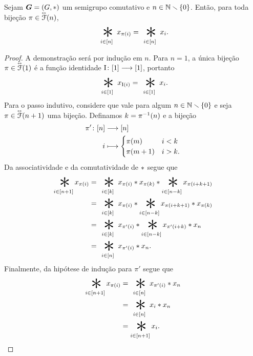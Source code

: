\begin{proposition}
\label{prop:comutatividade.generalizada}
Sejam $\bm G=(G,\ast)$ um semigrupo comutativo e $n \in \mathbb{N} \smallsetminus \{0\}$. Então, para toda bijeção $\pi \in \accentset{\leftrightarrow}{\mathcal{F}}(n)$,%
	\begin{equation*}
	\bigopb_{i \in [n]} x_{\pi(i)} = \bigopb_{i \in [n]} x_i.
	\end{equation*}
\end{proposition}
\begin{proof}
A demonstração será por indução em $n$. Para $n=1$, a única bijeção $\pi \in \accentset{\leftrightarrow}{\mathcal{F}}(1)$ é a função identidade ${\mathrm{I}}\colon {[1]} \longrightarrow {[1]}$, portanto
	\begin{equation*}
	\bigopb_{i \in [1]} x_{\Id(i)} = \bigopb_{i \in [1]} x_i.
	\end{equation*}
Para o passo indutivo, considere que vale para algum $n \in \mathbb{N} \smallsetminus \{0\}$ e seja $\pi \in \accentset{\leftrightarrow}{\mathcal{F}}(n+1)$ uma bijeção. Definamos $k = \pi^{-1}(n)$ e a bijeção
	\begin{align*}
	\func{\pi'}{[n]}{[n]}{i}{
		\begin{cases}
		\pi(m)		& i<k \\
		\pi(m+1) 	& i>k.
		\end{cases}
	}
	\end{align*}
Da associatividade e da comutatividade de $\ast$ segue que
	\begin{align*}
	\bigopb_{i \in [n+1]} x_{\pi(i)}
		&= \bigopb_{i \in [k]} x_{\pi(i)} \opb x_{\pi(k)} \opb \bigopb_{i \in [n-k]} x_{\pi(i+k+1)} \\
		&= \bigopb_{i \in [k]} x_{\pi(i)} \opb \bigopb_{i \in [n-k]} x_{\pi(i+k+1)} \opb x_{\pi(k)} \\
		&= \bigopb_{i \in [k]} x_{\pi'(i)} \opb \bigopb_{i \in [n-k]} x_{\pi'(i+k)} \opb x_n \\
		&= \bigopb_{i \in [n]} x_{\pi'(i)} \opb x_n.
	\end{align*}
Finalmente, da hipótese de indução para $\pi'$ segue que
	\begin{align*}
	\bigopb_{i \in [n+1]} x_{\pi(i)} &= \bigopb_{i \in [n]} x_{\pi'(i)} \opb x_n \\
		&= \bigopb_{i \in [n]} x_i \opb x_n \\
		&= \bigopb_{i \in [n+1]} x_i.
		\qedhere
	\end{align*}
\end{proof}
